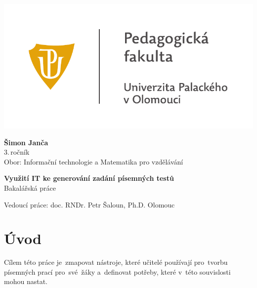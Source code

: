 \documentclass[14pt,a4paper]{article}
\begin{document}
	\begin{titlepage}
		\begin{center}
            {
            \centering
            \includegraphics[]{./img/UP_logo_PdF-UP_horizont_cz.pdf}
            }
			
			\vspace{3cm}

            {
                \LARGE
                \textbf{Šimon Janča}\\
                3.\,ročník\\[8mm]
                Obor: Informační technologie a Matematika pro vzdělávání
            }

            \vspace{4cm}
			
			{
			    \textbf{\Huge Využití IT ke generování zadání písemných testů}\\[4mm]
			    \Large
			    Bakalářská práce
			}

            \vfill
            
            {
                Vedoucí práce:
                doc. RNDr. Petr Šaloun, Ph.D.
                \hfill
    			Olomouc \the\year{}
            }
			
		\end{center}
	\end{titlepage}
	\tableofcontents

	\newpage
    \clearpage
    \setcounter{page}{1}
	
	\section{Úvod}
    Cílem této práce je~zmapovat nástroje, které učitelé používají pro~tvorbu písemných prací pro~své~žáky a~definovat potřeby, které v~této souvislosti mohou nastat.
    
\end{document}
